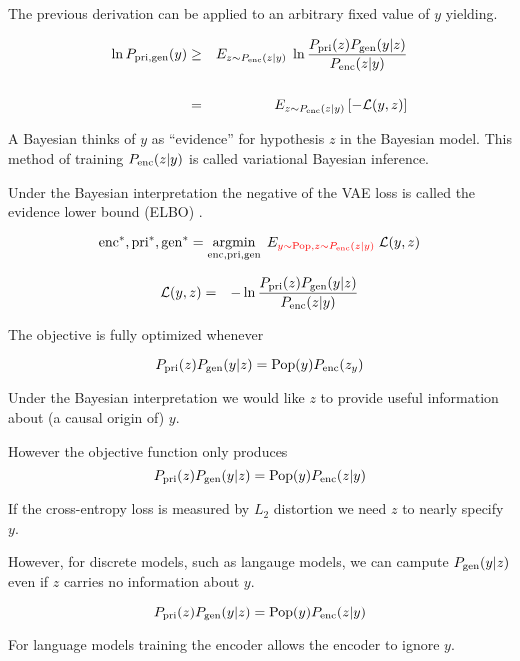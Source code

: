 {

The previous derivation can be applied to an arbitrary fixed value of $y$ yielding.

\begin{eqnarray*}
\ln P_{\mathrm{pri},\mathrm{gen}}(y) & \geq  & E_{z \sim P_{\mathrm{enc}}(z|y)}\; \ln \frac{P_{\mathrm{pri}}(z)P_{\mathrm{gen}}(y|z)}{P_{\mathrm{enc}}(z|y)} \\
\\
& = & E_{z \sim P_{\mathrm{enc}}(z|y)}\left[-{\cal L}(y,z)\right]
\end{eqnarray*}

\vfill
A Bayesian thinks of $y$ as ``evidence'' for hypothesis $z$ in the Bayesian model.  This method of training $P_{\mathrm{enc}}(z|y)$ is called {\color{red} variational Bayesian inference}.

\vfill
Under the Bayesian interpretation the negative of the VAE loss is called {\color{red} the evidence lower bound (ELBO)}    .


$$\mathrm{enc}^*,\mathrm{pri}^*,\mathrm{gen}^* = \operatorname*{argmin}_{\mathrm{enc},\mathrm{pri},\mathrm{gen}}\;E_{\color{red} y \sim \mathrm{Pop},z\sim P_{\mathrm{enc}}(z|y)}\;{\cal L}(y,z)$$

\vfill
\begin{eqnarray*}
{\cal L}(y,z) & = & - \ln \frac{P_{\mathrm{pri}}(z)P_{\mathrm{gen}}(y|z)}{P_{\mathrm{enc}}(z|y)}
\end{eqnarray*}

\vfill
The objective is fully optimized whenever

\vfill
$$P_{\mathrm{pri}}(z)P_{\mathrm{gen}}(y|z) = \mathrm{Pop}(y)P_{\mathrm{enc}}(z_y)$$


Under the Bayesian interpretation we would like $z$ to provide useful information about (a causal origin of) $y$.

\vfill
However the objective function only produces
$$P_{\mathrm{pri}}(z)P_{\mathrm{gen}}(y|z) = \mathrm{Pop}(y)P_{\mathrm{enc}}(z|y)$$

\vfill
If the cross-entropy loss is measured by $L_2$ distortion we need $z$ to nearly specify $y$.

\vfill
However, for discrete models, such as langauge models, we can campute $P_{\mathrm{gen}}(y|z)$ even if $z$ carries no information about $y$.



$$P_{\mathrm{pri}}(z)P_{\mathrm{gen}}(y|z) = \mathrm{Pop}(y)P_{\mathrm{enc}}(z|y)$$

\vfill
For language models training the encoder allows the encoder to ignore $y$.

}
